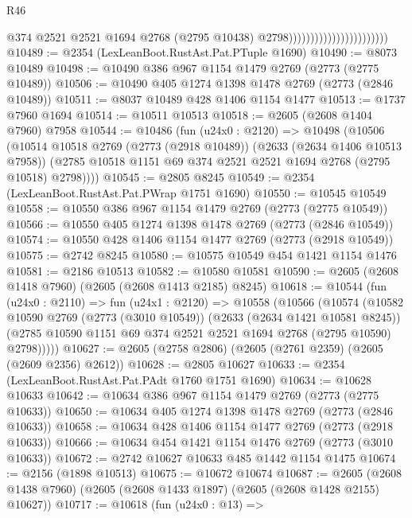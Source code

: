 \begin{lexlean}{R46}
\begin{coremodule}
                                                  @374
                                                  @2521
                                                  @2521
                                                  @1694
                                                  @2768
                                                  (@2795 @10438)
                                                  @2798)))))))))))))))))))))))
@10489 := @2354 (LexLeanBoot.RustAst.Pat.PTuple @1690)
@10490 := @8073 @10489
@10498 := @10490 @386 @967 @1154 @1479 @2769 (@2773 (@2775 @10489))
@10506 := @10490 @405 @1274 @1398 @1478 @2769 (@2773 (@2846 @10489))
@10511 := @8037 @10489 @428 @1406 @1154 @1477
@10513 := @1737 @7960 @1694
@10514 := @10511 @10513
@10518 := @2605 (@2608 @1404 @7960) @7958
@10544 := @10486
    (fun (u24x0 : @2120) =>
    @10498
      (@10506
        (@10514
          @10518
          @2769
          (@2773 (@2918 @10489))
          (@2633 (@2634 @1406 @10513 @7958))
          (@2785 @10518 @1151 @69 @374 @2521 @2521 @1694 @2768 (@2795 @10518) @2798))))
@10545 := @2805 @8245
@10549 := @2354 (LexLeanBoot.RustAst.Pat.PWrap @1751 @1690)
@10550 := @10545 @10549
@10558 := @10550 @386 @967 @1154 @1479 @2769 (@2773 (@2775 @10549))
@10566 := @10550 @405 @1274 @1398 @1478 @2769 (@2773 (@2846 @10549))
@10574 := @10550 @428 @1406 @1154 @1477 @2769 (@2773 (@2918 @10549))
@10575 := @2742 @8245
@10580 := @10575 @10549 @454 @1421 @1154 @1476
@10581 := @2186 @10513
@10582 := @10580 @10581
@10590 := @2605 (@2608 @1418 @7960) (@2605 (@2608 @1413 @2185) @8245)
@10618 := @10544
    (fun (u24x0 : @2110) =>
    fun (u24x1 : @2120) =>
    @10558
      (@10566
        (@10574
          (@10582
            @10590
            @2769
            (@2773 (@3010 @10549))
            (@2633 (@2634 @1421 @10581 @8245))
            (@2785 @10590 @1151 @69 @374 @2521 @2521 @1694 @2768 (@2795 @10590) @2798)))))
@10627 := @2605 (@2758 @2806) (@2605 (@2761 @2359) (@2605 (@2609 @2356) @2612))
@10628 := @2805 @10627
@10633 := @2354 (LexLeanBoot.RustAst.Pat.PAdt @1760 @1751 @1690)
@10634 := @10628 @10633
@10642 := @10634 @386 @967 @1154 @1479 @2769 (@2773 (@2775 @10633))
@10650 := @10634 @405 @1274 @1398 @1478 @2769 (@2773 (@2846 @10633))
@10658 := @10634 @428 @1406 @1154 @1477 @2769 (@2773 (@2918 @10633))
@10666 := @10634 @454 @1421 @1154 @1476 @2769 (@2773 (@3010 @10633))
@10672 := @2742 @10627 @10633 @485 @1442 @1154 @1475
@10674 := @2156 (@1898 @10513)
@10675 := @10672 @10674
@10687 := @2605 (@2608 @1438 @7960) (@2605 (@2608 @1433 @1897) (@2605 (@2608 @1428 @2155) @10627))
@10717 := @10618
    (fun (u24x0 : @13) =>

\end{coremodule}
\end{lexlean}
